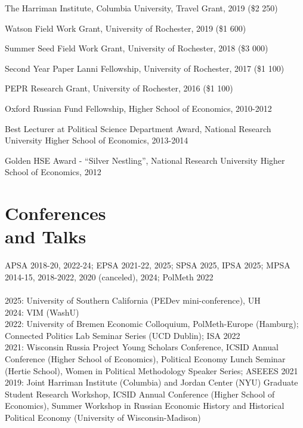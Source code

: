 \documentclass[margin,line,10.95pt]{res}
\begin{document}
\begin{resume}
The Harriman Institute, Columbia University, Travel Grant, 2019 (\$2 250)
\vspace*{-4.5mm}

Watson Field Work Grant, University of Rochester, 2019 (\$1 600)
\vspace*{-4.5mm}

Summer Seed Field Work Grant, University of Rochester, 2018 (\$3 000)
\vspace*{-4.5mm}

Second Year Paper Lanni Fellowship, University of Rochester, 2017 (\$1 100)
\vspace*{-4.5mm}

PEPR Research Grant, University of Rochester, 2016 (\$1 100)
\vspace*{-4.5mm}


Oxford Russian Fund Fellowship, Higher School of Economics, 2010-2012 
\vspace*{-2.5mm}

Best Lecturer at Political Science Department Award, National Research University Higher School of Economics, 2013-2014 
\vspace*{-4.5mm}

Golden HSE Award - ``Silver Nestling'', National Research University Higher School of Economics, 2012
\vspace*{-2.5mm}


\section{\sc Conferences \\ and Talks}

APSA 2018-20, 2022-24; EPSA 2021-22, 2025; SPSA 2025, IPSA 2025; MPSA 2014-15, 2018-2022, 2020 (canceled), 2024; PolMeth 2022
\\
\\
2025: University of Southern California (PEDev mini-conference), UH\\
2024: VIM (WashU) \\
2022: University of Bremen Economic Colloquium, PolMeth-Europe (Hamburg); Connected Politics Lab Seminar Series (UCD Dublin); ISA 2022
\\
2021: Wisconsin Russia Project Young Scholars Conference, ICSID Annual Conference (Higher School of Economics), Political Economy Lunch Seminar (Hertie School), Women in Political Methodology Speaker Series; ASEEES 2021
\\
2019: Joint Harriman Institute (Columbia) and Jordan Center (NYU) Graduate Student Research Workshop,  ICSID Annual Conference (Higher School of Economics), Summer Workshop in Russian Economic History and Historical Political Economy (University of Wisconsin-Madison) 



\end{resume}
\end{document}
